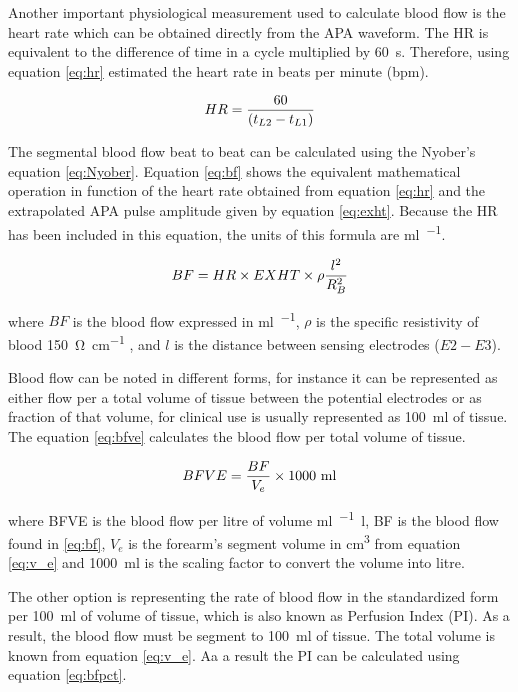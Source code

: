 Another important physiological measurement used to calculate blood flow is the heart rate which can be obtained directly from the APA waveform. The HR is equivalent to the difference of time in a cycle multiplied by \SI{60}{\second}. Therefore, using equation \ref{eq:hr} estimated the heart rate in beats per minute (\si{bpm}).

\begin{align}
	\label{eq:hr}
	HR = \frac{60}{(t_{L2}-t_{L1})}  \tagaddtext{[\si{bpm}]}
\end{align}


The segmental blood flow beat to beat can be calculated using the Nyober's equation \ref{eq:Nyober}. Equation \ref{eq:bf} shows the equivalent mathematical operation in function of the heart rate obtained from equation \ref{eq:hr} and the extrapolated APA pulse amplitude given by equation \ref{eq:exht}. Because the HR has been included in this equation, the units of this formula are \si{\milli\litre\per\min}. 

\begin{align}
	\label{eq:bf}
	BF = HR \times EXHT \times \rho \frac{l^2}{R_B^2} \tagaddtext{[\si{\ml\per\min}]}
\end{align}

where $BF$ is the blood flow expressed in \si{\milli\litre\per\min}, $\rho$ is the specific resistivity of blood \SI{150}{\ohm\per\cm} \cite{mohapatra1981non, nyober1950electrical}, and $l$ is the distance between sensing electrodes ($E2 - E3$).

Blood flow can be noted in different forms, for instance it can be represented as either flow per a total volume of tissue between the potential electrodes or as fraction of that volume, for clinical use is usually represented as \SI{100}{\milli\litre} of tissue. The equation \ref{eq:bfve} calculates the blood flow per total volume of tissue.

\begin{align}
	\label{eq:bfve}
	BFVE = \frac{BF}{V_e} \times \text{1000 ml} \tagaddtext{[\si{\ml\per\min.\litre}]}
\end{align}

where BFVE is the blood flow per litre of volume \si{\ml\per\min.\litre}, BF is the blood flow found in \ref{eq:bf}, $V_e$ is the forearm's segment volume in \si{\cubic\cm} from equation \ref{eq:v_e} and \SI{1000}{\milli\litre} is the scaling factor to convert the volume into litre.

The other option is representing the rate of blood flow in the standardized form per \SI{100}{\milli\litre} of volume of tissue, which is also known as Perfusion Index (PI). As a result, the blood flow must be segment to \SI{100}{\milli\litre} of tissue. The total volume is known from equation \ref{eq:v_e}. Aa a result the PI can be calculated using equation  \ref{eq:bfpct}. 

